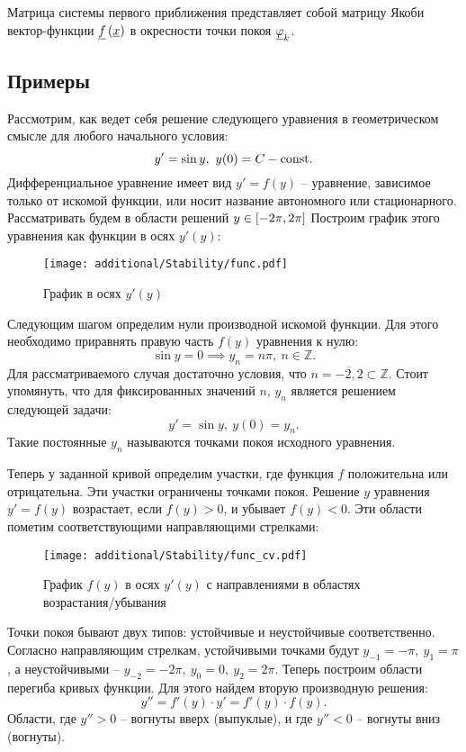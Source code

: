 	Матрица системы первого приближения представляет собой матрицу Якоби вектор-функции $\underline{f}\left( \underline{x} \right)$ в окресности точки покоя $\underline{\varphi}_k$.

	\subsection{Примеры}
		Рассмотрим, как ведет себя решение следующего уравнения в геометрическом смысле для любого начального условия:
		\[ y' = \sin{y}, ~ y(0) = C - \mathrm{const}. \]
		Дифференциальное уравнение имеет вид $y' = f(y)$ -- уравнение, зависимое только от искомой функции, или носит название автономного или стационарного. Рассматривать будем в области решений $y \in \left[ -2\pi, 2\pi \right]$ Построим график этого уравнения как функции в осях $y'(y)$:
		\begin{figure}[H]
			\centering
			\texttt{[image: additional/Stability/func.pdf]}
			\caption{График в осях $y'(y)$}
		\end{figure}
		Следующим шагом определим нули производной искомой функции. Для этого необходимо приравнять правую часть $f(y)$ уравнения к нулю:
		\[ \sin{y} = 0 \implies y_n = n\pi, ~ n \in \mathbb{Z}. \]
		Для рассматриваемого случая достаточно условия, что $n = \overline{-2, 2} \subset \mathbb{Z}$. Стоит упомянуть, что для фиксированных значений $n$, $y_n$ является решением следующей задачи:
		\[ y' = \sin{y}, ~ y(0) = y_n. \]
		Такие постоянные $y_n$ называются точками покоя исходного уравнения.

		Теперь у заданной кривой определим участки, где функция $f$ положительна или отрицательна. Эти участки ограничены точками покоя. Решение $y$ уравнения $y' = f(y)$ возрастает, если $f(y) > 0$, и убывает $f(y) < 0$. Эти области пометим соответствующими направляющими стрелками:
		\begin{figure}[H]
			\centering
			\texttt{[image: additional/Stability/func\_cv.pdf]}
			\caption{График $f(y)$ в осях $y'(y)$ с направлениями в областях возрастания/убывания}
		\end{figure}

		Точки покоя бывают двух типов: устойчивые и неустойчивые соответственно. Согласно направляющим стрелкам, устойчивыми точками будут $y_{-1} = -\pi, ~ y_{1} = \pi$, а неустойчивыми -- $y_{-2} = -2\pi, ~ y_0 = 0, ~ y_{2} = 2\pi$. Теперь построим области перегиба кривых функции. Для этого найдем вторую производную решения:
		\[ y'' = f'(y) \cdot y' = f'(y) \cdot f(y). \]
		Области, где $y'' > 0$ -- вогнуты вверх (выпуклые), и где $y'' < 0$ -- вогнуты вниз (вогнуты).

